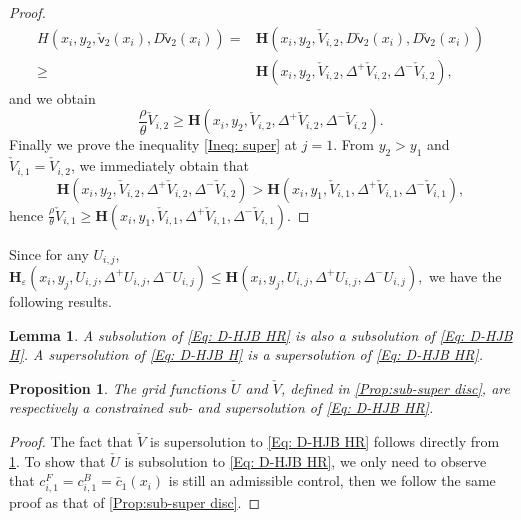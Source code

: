 \documentclass[11pt]{article}
\numberwithin{equation}{section}
\numberwithin{algorithm}{section}
\newtheorem{lemma}[lemma]{Lemma}
\newtheorem{proposition}[proposition]{Proposition}
\newcommand{\lc}{\left(}
\newcommand{\rc}{\right)}
\def\sv{{\mathsf{v}}}
\newcommand{\eps}{\varepsilon}
\theoremstyle{plain}
\newcommand{\D}{\Delta}
\begin{document}
\begin{proof}
\begin{align*}
H(x_i,y_2,\check{\sv}_{2}(x_i),D\check{\sv}_{2}(x_i))
={}&\boldsymbol{H}\lc x_i,y_2,\check{V}_{i,2},D\check{\sv}_{2}(x_i),D\check{\sv}_{2}(x_i)\rc \\
\geq {}&\boldsymbol{H}\lc x_i,y_2,\check{V}_{i,2},\D^+{\check{V}_{i,2}},\D^-{\check{V}_{i,2}}\rc,
\end{align*}
and we obtain
$$
\frac{\rho}{\theta}\check{V}_{i,2}\geq \boldsymbol{H}\lc x_i,y_2,\check{V}_{i,2},\D^+{\check{V}_{i,2}},\D^-{\check{V}_{i,2}}\rc.
$$
Finally we prove the inequality \cref{Ineq: super} at $j=1$. From $y_2>y_1$ and $\check{V}_{i,1}=\check{V}_{i,2}$, we immediately obtain that 
$$
\boldsymbol{H}\lc x_i,y_2,\check{V}_{i,2},\D^+{\check{V}_{i,2}},\D^-{\check{V}_{i,2}}\rc>\boldsymbol{H}\lc x_i,y_1,\check{V}_{i,1},\D^+{\check{V}_{i,1}},\D^-{\check{V}_{i,1}}\rc,
$$
hence 
$
\frac{\rho}{\theta}\check{V}_{i,1}\geq \boldsymbol{H}\lc x_i,y_1,\check{V}_{i,1},\D^+{\check{V}_{i,1}},\D^-{\check{V}_{i,1}}\rc.
$
\end{proof}
 Since for any $U_{i,j}$,
$
\boldsymbol{H}_{\eps}\lc x_i,y_j,U_{i,j},\D^+{U_{i,j}},\D^-{U_{i,j}}\rc \leq \boldsymbol{H}\lc x_i,y_j,U_{i,j},\D^+{U_{i,j}},\D^-{U_{i,j}}\rc,
$
we have the following results.
\begin{lemma}\label{Prop: sub super HR1}
A subsolution of \cref{Eq: D-HJB HR} is also a subsolution of \cref{Eq: D-HJB H}. A supersolution of \cref{Eq: D-HJB H} is a supersolution of \cref{Eq: D-HJB HR}.
\end{lemma}
\begin{proposition}\label{Prop: sub super HR2}
The grid functions $\check{U}$ and $\check{V}$, defined in \cref{Prop:sub-super disc}, are respectively a constrained sub- and supersolution of \cref{Eq: D-HJB HR}.  
\end{proposition}
\begin{proof}
The fact that $\check{V}$ is supersolution to \cref{Eq: D-HJB HR} follows directly from \cref{Prop: sub super HR1}. To show that $\check{U}$ is subsolution to \cref{Eq: D-HJB HR}, we only need to observe that $c^F_{i,1}=c^B_{i,1}=\bar{c}_1(x_i)$ is still an admissible control, then we follow the same proof as that of \cref{Prop:sub-super disc}.
\end{proof}
\end{document}
